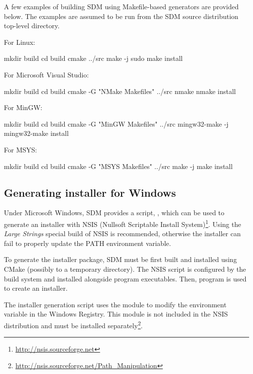 \documentclass[a4paper,12pt,twoside,extrafontsizes]{memoir}
\begin{document}
A few examples of building SDM using Makefile-based generators are provided below. The examples are assumed to be run from the SDM source distribution top-level directory.

For Linux:

\begin{shellcmds}
mkdir build
cd build
cmake ../src
make -j
sudo make install
\end{shellcmds}

For Microsoft Visual Studio:

\begin{shellcmds}
mkdir build
cd build
cmake -G "NMake Makefiles" ../src
nmake
nmake install
\end{shellcmds}

For MinGW:

\begin{shellcmds}
mkdir build
cd build
cmake -G "MinGW Makefiles" ../src
mingw32-make -j
mingw32-make install
\end{shellcmds}

For MSYS:

\begin{shellcmds}
mkdir build
cd build
cmake -G "MSYS Makefiles" ../src
make -j
make install
\end{shellcmds}

\subsection{Generating installer for Windows}
\label{subsec:wininstaller}

Under Microsoft Windows, SDM provides a script, , which can be used to generate an installer with NSIS (Nullsoft Scriptable Install System)\footnote{\url{http://nsis.sourceforge.net}}. Using the \emph{Large Strings} special build of NSIS is recommended, otherwise the installer can fail to properly update the PATH environment variable.

To generate the installer package, SDM must be first built and installed using CMake (possibly to a temporary directory). The NSIS script is configured by the build system and installed alongside program executables. Then,  program is used to create an installer.

The installer generation script uses the  module to modify the  environment variable in the Windows Registry. This module is not included in the NSIS distribution and must be installed separately\footnote{\url{http://nsis.sourceforge.net/Path_Manipulation}}.
\end{document}
